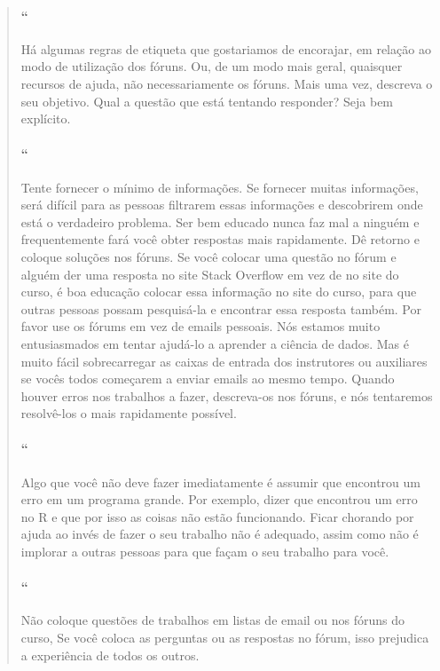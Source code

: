 \begin{quotation}
\begin{small}
\paragraph{``}
Há algumas regras de etiqueta que gostariamos de encorajar, em relação ao modo de utilização dos fóruns. Ou, de um modo mais geral, quaisquer recursos de ajuda, não necessariamente os fóruns. Mais uma vez, descreva o seu objetivo. Qual a questão que está tentando responder? Seja bem explícito.

\paragraph{``}
Tente fornecer o mínimo de informações. Se fornecer muitas informações, será difícil para as pessoas filtrarem essas informações e descobrirem onde está o verdadeiro problema. Ser bem educado nunca faz mal a ninguém e frequentemente fará você obter respostas mais rapidamente. Dê retorno e coloque soluções nos fóruns. Se você colocar uma questão no fórum e alguém der uma resposta no site Stack Overflow em vez de no site do curso, é boa educação colocar essa informação no site do curso, para que outras pessoas possam pesquisá-la e encontrar essa resposta também. Por favor use os fórums em vez de emails pessoais. Nós estamos muito entusiasmados em tentar ajudá-lo a aprender a ciência de dados. Mas é muito fácil sobrecarregar as caixas de entrada  dos instrutores ou auxiliares se vocês todos começarem a enviar emails ao mesmo tempo. Quando houver erros nos trabalhos a fazer, descreva-os nos fóruns, e nós tentaremos resolvê-los o mais rapidamente possível.

\paragraph{``}
Algo que você não deve fazer imediatamente é assumir que encontrou um erro em um programa grande. Por exemplo, dizer que encontrou um erro no R e que por isso as coisas não estão funcionando. Ficar chorando por ajuda ao invés de fazer o seu trabalho não é adequado,  assim como não é implorar a outras pessoas para que façam o seu trabalho para você.

\paragraph{``}
Não coloque questões de trabalhos em listas de email ou nos fóruns do curso, Se você coloca as perguntas ou as respostas no fórum, isso prejudica a experiência de todos os outros.


\end{small}
\end{quotation}

